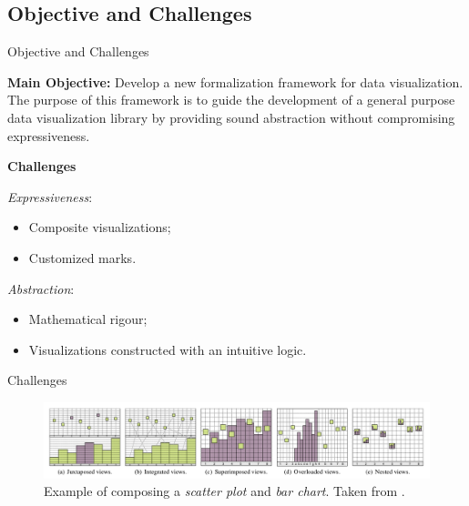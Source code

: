 \documentclass[aspectratio=169,xcolor=dvipsnames,9pt]{beamer}
\begin{document}
\subsection[Objective]{Objective and Challenges}
\begin{frame}[fragile]{Objective and Challenges}

	\textbf{Main Objective:} Develop a new
	formalization framework for data visualization. The purpose of this framework is
	to guide the development of a general purpose data visualization library by providing sound abstraction without
	compromising expressiveness.
	\vspace{3mm}

	\textbf{Challenges}
	\vspace{2mm}

	\textit{Expressiveness}:
	\begin{itemize}
		\item Composite visualizations;
		\item Customized marks.
	\end{itemize}

	\textit{Abstraction}:
	\begin{itemize}
		\item Mathematical rigour;
		\item Visualizations constructed with an intuitive logic.
	\end{itemize}

\end{frame}

\begin{frame}[fragile]{Challenges}

	\begin{figure}[H]
		\begin{center}
			\includegraphics[width=1.\textwidth]{./figures/vizcomp.png}
		\end{center}
		\caption{Example of composing a \textit{scatter plot} and \textit{bar chart}. Taken from \citet{javed2012exploring}.}
		\label{fig:vizcomp}
	\end{figure}

\end{frame}
\end{document}
